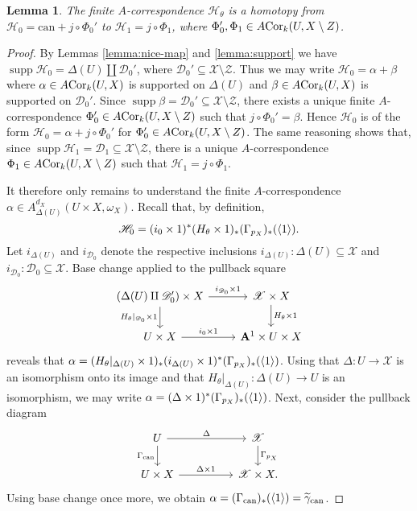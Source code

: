 \documentclass[a4paper, oneside, english,reqno]{amsart}
\DeclarePairedDelimiter{\ip}{\langle}{\rangle}
\theoremstyle{plain}
\newtheorem{lemma}[theorem]{Lemma}
\theoremstyle{definition}
\theoremstyle{remark}
\newcommand{\wt}{\widetilde}
\newcommand{\ACor}{A\mkern-3mu\Cor}
\newcommand{\A}{\mathbf{A}}
\newcommand{\scrD}{\mathscr{D}}
\newcommand{\scrH}{\mathscr{H}}
\newcommand{\scrX}{\mathscr{X}}
\newcommand{\scrZ}{\mathscr{Z}}
\newcommand{\can}{\mathrm{can}}
\DeclareMathOperator{\supp}{supp}
\DeclareMathOperator{\Cor}{Cor}
\begin{document}
\begin{lemma}\label{lemma:finding-Phi}
The finite $A$-correspondence $\scrH_\theta$ is a homotopy from $\scrH_0=\can+j\circ \Phi_0'$ to $\scrH_1=j\circ\Phi_1$, where $\Phi_0',\Phi_1\in\ACor_k(U,X\setminus Z)$.
\end{lemma}

\begin{proof}
By Lemmas \ref{lemma:nice-map} and \ref{lemma:support} we have $\supp\scrH_0=\Delta(U)\amalg\scrD_0'$, where $\scrD_0'\subseteq\scrX\setminus\scrZ$. Thus we may write $\scrH_0=\alpha+\beta$ where $\alpha\in\ACor_k(U,X)$ is supported on $\Delta(U)$ and $\beta\in\ACor_k(U,X)$ is supported on $\scrD_0'$. Since $\supp\beta=\scrD_0'\subseteq\scrX\setminus\scrZ$, there exists  a unique finite $A$-correspondence  $\Phi_0'\in\ACor_k(U,X\setminus Z)$ such that $j\circ\Phi_0'=\beta$. Hence $\scrH_0$ is of the form $\scrH_0=\alpha+j\circ\Phi_0'$ for $\Phi_0'\in\ACor_k(U,X\setminus Z)$. The same reasoning shows that, since $\supp\scrH_1= \scrD_1\subseteq\scrX\setminus\scrZ$, there is a unique $A$-correspondence $\Phi_1\in\ACor_k(U,X\setminus Z)$ such that $\scrH_1=j\circ\Phi_1$. 

It therefore only remains to understand the finite $A$-correspondence $\alpha\in A_{\Delta(U)}^{d_X}(U\times X,\omega_{X})$. Recall that, by definition, 
\[
\scrH_0=(i_0\times1)^*(H_\theta\times1)_*(\Gamma_{p_X})_*(\ip1).
\]
Let $i_{\Delta(U)}$ and $i_{\scrD_0}$ denote the respective inclusions $i_{\Delta(U)}\colon\Delta(U)\subseteq \scrX$ and $i_{\scrD_0}\colon\scrD_0\subseteq\scrX$. Base change applied to the pullback square
\[\begin{tikzcd}
(\Delta(U)\amalg\scrD_0')\times X\ar{r}{i_{\scrD_0}\times1}\ar{d}[swap]{H_\theta|_{\scrD_0}\times1} & \scrX\times X\ar{d}{H_\theta\times1}\\
U\times X\ar{r}{i_0\times1} & \A^1\times U\times X
\end{tikzcd}\]
reveals that $\alpha=(H_\theta|_{\Delta(U)}\times1)_*(i_{\Delta(U)}\times1)^*(\Gamma_{p_X})_*(\ip1)$. Using that $\Delta\colon U\to\scrX$ is an isomorphism onto its image and that $H_\theta|_{\Delta(U)}\colon\Delta(U)\to U$ is an isomorphism, we may write $\alpha=(\Delta\times1)^*(\Gamma_{p_X})_*(\ip1)$. Next, consider the pullback diagram
\[\begin{tikzcd}
U\ar{rr}{\Delta}\ar{d}[swap]{\Gamma_\can} & & \scrX\ar{d}{\Gamma_{p_X}}\\
U\times X\ar{rr}{\Delta\times1} & &\scrX\times X.
\end{tikzcd}\]
Using base change once more, we obtain $\alpha=(\Gamma_\can)_*(\ip1)=\wt\gamma_\can$.
\end{proof}
\end{document}
